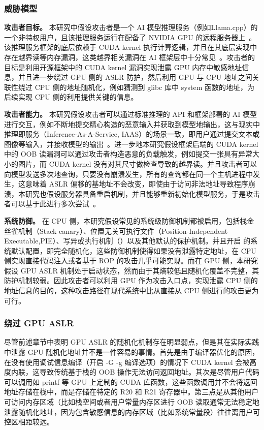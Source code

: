 \subsubsection{威胁模型}
\textbf{攻击者目标。}
本研究中假设攻击者是一个 AI 模型推理服务（例如Llama.cpp）的一个非特权用户，且该推理服务运行在配备了 NVIDIA GPU 的远程服务器上~\cite{ggml2025llama}。该推理服务框架的底层依赖于 CUDA kernel 执行计算逻辑，并且在其底层实现中存在越界读等内存漏洞，这类越界相关漏洞在 AI 框架层中十分常见~\cite{llama2025issue8798,pytorch_issue_127652,tensorflow_issue_92413}。攻击者的目标是利用开源框架中的 CUDA kernel 漏洞实现泄露 GPU 内存中敏感地址信息，并且进一步绕过 GPU 侧的 ASLR 防护，然后利用 GPU 与 CPU 地址之间关联性绕过 CPU 侧的地址随机化，例如猜测到 glibc 库中 system 函数的地址，为后续实现 CPU 侧的利用提供关键的信息。

\textbf{攻击者能力。}
本研究假设攻击者可以通过标准推理的 API 和框架部署的 AI 模型进行交互，例如不断地提交精心构造的恶意输入并获取到模型地输出，这与现实中推理即服务（Inference-As-A-Service, IAAS）的场景一致，即用户通过提交文本或图像等输入，并接收模型的输出~\cite{openwebui2025}。进一步地本研究假设框架后端的 CUDA kernel 中的 OOB 读漏洞可以通过攻击者构造恶意的负载触发，例如提交一张具有异常大小的图片，而 CUDA kernel 没有对其尺寸做检查导致的越界读。并且攻击者可以向模型发送多次地查询，只要没有崩溃发生，所有的查询都在同一个主机进程中发生，这意味着 ASLR 偏移的基地址不会改变，即使由于访问非法地址导致程序崩溃，本研究也假设服务器具备重启机制，并且能够重新初始化模型服务，于是攻击者可以基于此进行多次尝试~\cite{rickman2024ollama}。

\textbf{系统防御。}
在 CPU 侧，本研究假设常见的系统级防御机制都被启用，包括栈金丝雀机制（Stack canary）、位置无关可执行文件（Position-Independent Executable,PIE）、写异或执行机制（）以及其他默认的保护机制。并且开启  的系统默认配置，即完全随机化，这些防御机制使得如果没有泄露特定地址，在 CPU 侧实现直接代码注入或者基于 ROP 的攻击几乎可能实现。而在 GPU 侧，本研究假设 GPU ASLR 机制处于启动状态，然而由于其熵较低且随机化覆盖不完整，其防护机制较弱。因此攻击者可以利用 GPU 作为攻击入口点，实现泄露 CPU 侧的地址信息的目的，这种攻击路径在现代系统中比从直接从 CPU 侧进行的攻击更为可行。

\subsubsection{绕过 GPU ASLR}
尽管前述章节中表明 GPU ASLR 的随机化机制存在明显弱点，但是其在实际实践中泄露 GPU 随机化地址并不是一件容易的事情。首先是由于编译器优化的原因，在没有使用调试信息编译（开启 -G -g 编译选项）的情况下 CUDA kernel 会被高度内联，这导致传统基于栈的 OOB 操作无法访问返回地址。其次是尽管用户代码可以调用如 printf 等 GPU 上定制的 CUDA 库函数，这些函数调用并不会将返回地址存储在栈中，而是存储在特定的 R20 和 R21 寄存器中。第三点是从其他用户可访问内存区域（比如栈空间或者用户常量内存区进行 OOB 读取通常无法稳定地泄露随机化地址，因为包含敏感信息的内存区域（比如系统常量段）往往离用户可控区相距较远。

